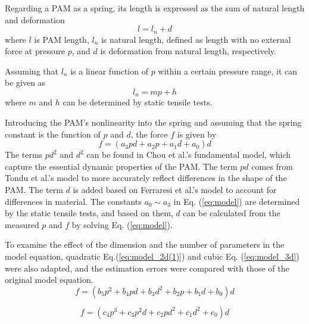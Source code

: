 Regarding a PAM as a spring\cite{spring}, its length is expressed as the sum of natural length and deformation
\begin{equation}
   l = l_n + d
\label{eq:estimation}
\end{equation}
where $l$ is PAM length, $l_n$ is natural length, defined as length with no external force at pressure $p$, and $d$ is deformation from natural length, respectively.
 
Assuming that $l_n$ is a linear function of $p$ within a certain pressure range, it can be given as
\begin{equation}
l_n = mp + h
\label{eq:L_n}
\end{equation}
where $m$ and $h$ can be determined by static tensile tests.
 
Introducing the PAM's nonlinearity into the spring and assuming that the spring constant is the function of $p$ and $d$, the force $f$ is given by
\begin{equation}
\label{eq:model}
f = (a_3pd + a_2p + a_1d + a_0)d
\end{equation}
The terms $pd^2$ and $d^2$ can be found in Chou et al.'s fundamental model\cite{chouMeasurementModelingMcKibben1996}, which capture the essential dynamic properties of the PAM. The term $pd$  comes from Tondu et al.'s model\cite{ModelingControl} to more accurately reflect differences in the shape of the PAM. The term $d$ is added based on Ferraresi et al.'s model\cite{Comparison} to account for differences in material. The constants $a_0 \sim a_3$ in Eq. (\ref{eq:model}) are determined by the static tensile tests, and based on them, $d$  can be calculated from the measured $p$ and $f$ by solving Eq. (\ref{eq:model}).

To examine the effect of the dimension and the number of parameters in the model equation, quadratic Eq.(\ref{eq:model_2d(1)}) and cubic Eq. (\ref{eq:model_3d}) were also adapted, and the estimation errors were compared with those of the original model equation.
\begin{equation}
   \label{eq:model_2d(1)}
   f = (b_5p^2 + b_4pd + b_3d^2 + b_2p+b_1d+b_0)d
   \end{equation}

   \begin{equation}
      \label{eq:model_3d}
      f = (c_4p^3+c_3p^2d+c_2pd^2+c_1d^2+c_0)d
  \end{equation}